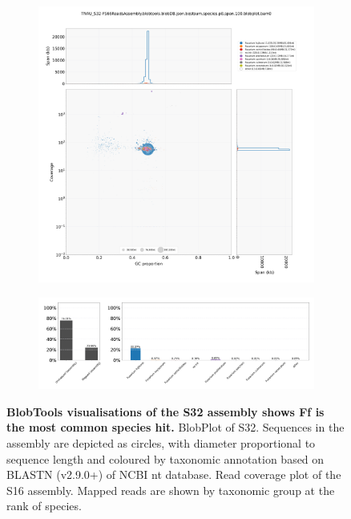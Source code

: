 \begin{figure}[hp!]
    \centering
    \begin{subfigure}[]{0.9\textwidth}
        \centering
        \includegraphics[width=\textwidth]{Appendices/TNAU_S32-FS66ReadsAssembly.blobtools.blobDB.json.bestsum.species.p8.span.100.blobplot.bam0.png}
        \caption{}
        \label{fig:BlobPlot-S32}
    \end{subfigure}
    \begin{subfigure}[]{0.9\textwidth}
        \centering
        \includegraphics[width=\textwidth]{Appendices/TNAU_S32-FS66ReadsAssembly.blobtools.blobDB.json.bestsum.species.p8.span.100.blobplot.read_cov.bam0.png}
        \caption{}
        \label{fig:BlobPlot_readcov-S32}
    \end{subfigure}
    \caption[BlobTools visualisations of the S32 assembly]{\textbf{BlobTools visualisations of the S32 assembly shows \acf{Ff} is the most common species hit.}
         BlobPlot of S32. Sequences in the assembly are depicted as circles, with diameter proportional to sequence length and coloured by taxonomic annotation based on BLASTN (v2.9.0+) of NCBI nt database.
         Read coverage plot of the S16 assembly. Mapped reads are shown by taxonomic group at the rank of species.}
        \label{fig:S32:BlobTools}
\end{figure}
